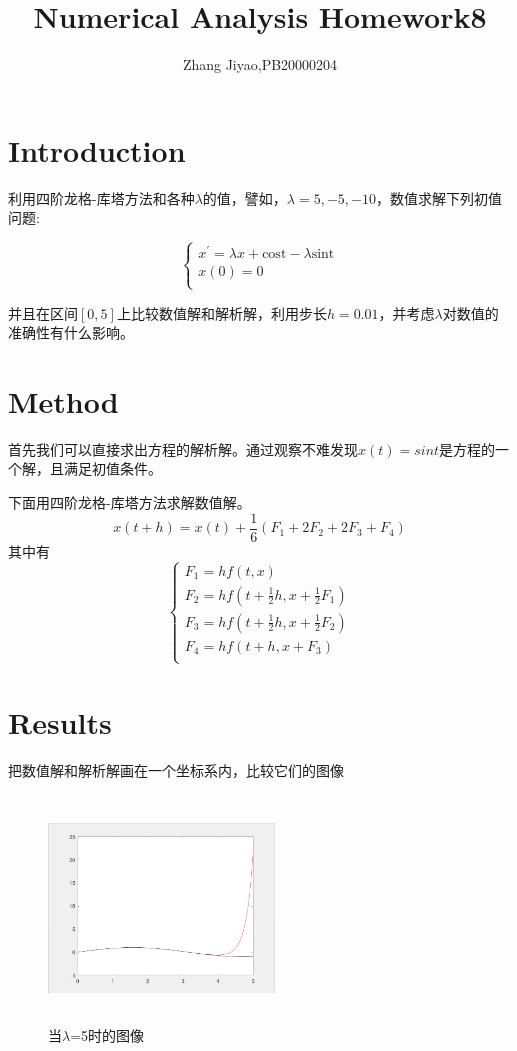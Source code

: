 \documentclass{article}
\title{Numerical Analysis Homework8}
\author{Zhang Jiyao,PB20000204}
\begin{document}
	\maketitle
	
	\section{Introduction}
	利用四阶龙格-库塔方法和各种$\lambda$的值，譬如，$\lambda=5,-5,-10$，数值求解下列初值问题:
	
$$	\left\{ 
	\begin{array}{lc}
		x^{'} = \lambda x+\text{cost}-\lambda \text{sint} \\
		x(0)=0\\
	\end{array}
	\right.$$
	
	并且在区间$[0,5]$上比较数值解和解析解，利用步长$h=0.01$，并考虑$\lambda$对数值的准确性有什么影响。
	
	
	\section{Method}
	 首先我们可以直接求出方程的解析解。通过观察不难发现$x(t)=sint$是方程的一个解，且满足初值条件。
	 
	 下面用四阶龙格-库塔方法求解数值解。
	 $$ x(t+h)=x(t)+\frac{1}{6}(F_1+2F_2+2F_3+F_4)$$
	 其中有
	 $$	
	 \left\{ 
	 \begin{array}{lc}
	 	F_1 = hf(t,x) \\
	    F_2 = hf(t+\frac{1}{2}h,x+\frac{1}{2}F_1) \\
	 	F_3 = hf(t+\frac{1}{2}h,x+\frac{1}{2}F_2) \\
	 	F_4 = hf(t+h,x+F_3) \\
	 \end{array}
	 \right.$$

	
	
	\section{Results}
	
	把数值解和解析解画在一个坐标系内，比较它们的图像
	
		\begin{figure}[H]
		\begin{center}
			
			\includegraphics[width=6cm,height=6cm]{5}
			
			\caption{当$\lambda$=5时的图像} \label{5.label}
		\end{center}
	\end{figure}
	
\end{document}
